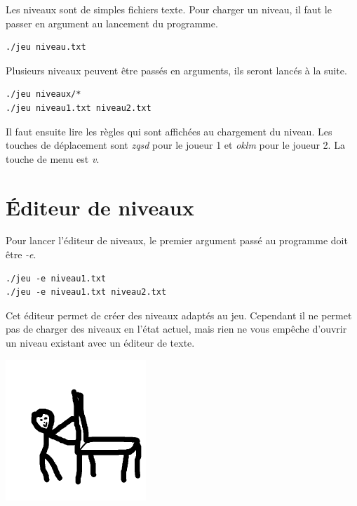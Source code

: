 \documentclass{article}
\begin{document}
Les niveaux sont de simples fichiers texte. 
Pour charger un niveau, il faut le passer en argument au lancement du programme.
\begin{lstlisting}
./jeu niveau.txt
\end{lstlisting}
Plusieurs niveaux peuvent être passés en arguments, ils seront lancés à la suite.
\begin{lstlisting}
./jeu niveaux/*
./jeu niveau1.txt niveau2.txt
\end{lstlisting}
Il faut ensuite lire les règles qui sont affichées au chargement du niveau.
Les touches de déplacement sont \emph{zqsd} pour le joueur 1 et \emph{oklm} pour le joueur 2.
La touche de menu est \emph{v}.

\section{Éditeur de niveaux}
Pour lancer l'éditeur de niveaux, le premier argument passé au programme doit être \emph{-e}.
\begin{lstlisting}
./jeu -e niveau1.txt
./jeu -e niveau1.txt niveau2.txt
\end{lstlisting}
Cet éditeur permet de créer des niveaux adaptés au jeu. Cependant il ne permet pas de charger des niveaux en l'état actuel, mais rien ne vous empêche d'ouvrir un niveau existant avec un éditeur de texte.

\begin{center}
    \includegraphics[width=200px,height=200px]{logo.png}
\end{center}
\end{document}
